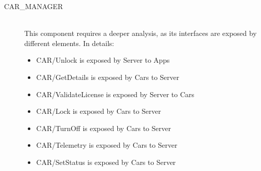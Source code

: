 \documentclass[11pt]{article} %
\begin{document}
\begin{description}
	\item[CAR\_MANAGER] \hfill \\
	This component requires a deeper analysis, as its interfaces are exposed by different elements. In details:
	\begin{itemize}
		\item CAR/Unlock is exposed by Server to Apps
		\item CAR/GetDetails is exposed by Cars to Server
		\item CAR/ValidateLicense is exposed by Server to Cars
		\item CAR/Lock is exposed by Cars to Server
		\item CAR/TurnOff is exposed by Cars to Server
		\item CAR/Telemetry is exposed by Cars to Server
		\item CAR/SetStatus is exposed by Cars to Server
	\end{itemize}
\end{description}
	
\end{document}
